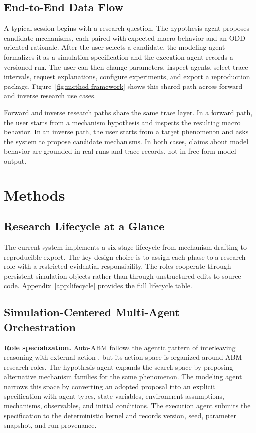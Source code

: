 \documentclass[11pt]{article}
\newcommand{\sys}{Auto-ABM}
\begin{document}
\subsection{End-to-End Data Flow}
\label{subsec:dataflow}

A typical session begins with a research question. The hypothesis agent proposes candidate mechanisms, each paired with expected macro behavior and an ODD-oriented rationale. After the user selects a candidate, the modeling agent formalizes it as a simulation specification and the execution agent records a versioned run. The user can then change parameters, inspect agents, select trace intervals, request explanations, configure experiments, and export a reproduction package. Figure~\ref{fig:method-framework} shows this shared path across forward and inverse research use cases.

Forward and inverse research paths share the same trace layer. In a forward path, the user starts from a mechanism hypothesis and inspects the resulting macro behavior. In an inverse path, the user starts from a target phenomenon and asks the system to propose candidate mechanisms. In both cases, claims about model behavior are grounded in real runs and trace records, not in free-form model output.

\section{Methods}
\label{sec:methods}

\subsection{Research Lifecycle at a Glance}
\label{subsec:lifecycle}

The current system implements a six-stage lifecycle from mechanism drafting to reproducible export. The key design choice is to assign each phase to a research role with a restricted evidential responsibility. The roles cooperate through persistent simulation objects rather than through unstructured edits to source code. Appendix~\ref{app:lifecycle} provides the full lifecycle table.

\subsection{Simulation-Centered Multi-Agent Orchestration}
\label{subsec:workflow}

\textbf{Role specialization.} \sys{} follows the agentic pattern of interleaving reasoning with external action \citep{yao2023react}, but its action space is organized around ABM research roles. The hypothesis agent expands the search space by proposing alternative mechanism families for the same phenomenon. The modeling agent narrows this space by converting an adopted proposal into an explicit specification with agent types, state variables, environment assumptions, mechanisms, observables, and initial conditions. The execution agent submits the specification to the deterministic kernel and records version, seed, parameter snapshot, and run provenance.
\end{document}
